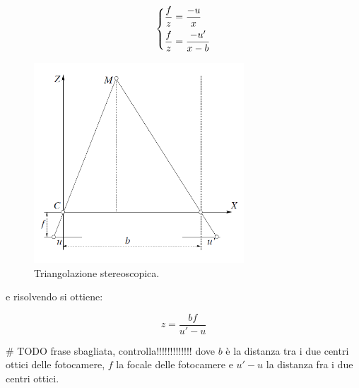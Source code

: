 \documentclass[12pt]{report}
\begin{document}
			\[
			\begin{dcases}
				\frac{f}{z}=\frac{-u}{x} \\
				\frac{f}{z}=\frac{-u'}{x-b}
			\end{dcases}
			\]
			
			\begin{figure}
				\includegraphics[width=0.7\textwidth]{./figures/Triangolazione_stereoscopica.png}
				\caption{Triangolazione stereoscopica.}
				\label{fig:triangolazione}
			\end{figure}
			
			e risolvendo si ottiene:

			\[
			z=\frac{bf}{u'-u}
			\]
			
			\# TODO frase sbagliata, controlla!!!!!!!!!!!!! \newline
			dove $b$ è la distanza tra i due centri ottici delle fotocamere, $f$ la focale delle fotocamere e $u'-u$ la distanza fra i due centri ottici.
			
			
			
			
		
\end{document}
